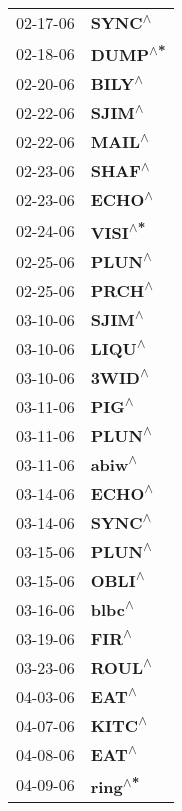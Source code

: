 \begin{supertabular}{p{0.08\textwidth}p{0.2\textwidth}}
 02-17-06 &    \textbf{SYNC\textsuperscript{$\wedge$}} \\
 02-18-06 &   \textbf{DUMP\textsuperscript{$\wedge$*}} \\
 02-20-06 &    \textbf{BILY\textsuperscript{$\wedge$}} \\
 02-22-06 &    \textbf{SJIM\textsuperscript{$\wedge$}} \\
 02-22-06 &    \textbf{MAIL\textsuperscript{$\wedge$}} \\
 02-23-06 &    \textbf{SHAF\textsuperscript{$\wedge$}} \\
 02-23-06 &    \textbf{ECHO\textsuperscript{$\wedge$}} \\
 02-24-06 &   \textbf{VISI\textsuperscript{$\wedge$*}} \\
 02-25-06 &    \textbf{PLUN\textsuperscript{$\wedge$}} \\
 02-25-06 &    \textbf{PRCH\textsuperscript{$\wedge$}} \\
 03-10-06 &    \textbf{SJIM\textsuperscript{$\wedge$}} \\
 03-10-06 &    \textbf{LIQU\textsuperscript{$\wedge$}} \\
 03-10-06 &    \textbf{3WID\textsuperscript{$\wedge$}} \\
 03-11-06 &     \textbf{PIG\textsuperscript{$\wedge$}} \\
 03-11-06 &    \textbf{PLUN\textsuperscript{$\wedge$}} \\
 03-11-06 &    \textbf{abiw\textsuperscript{$\wedge$}} \\
 03-14-06 &    \textbf{ECHO\textsuperscript{$\wedge$}} \\
 03-14-06 &    \textbf{SYNC\textsuperscript{$\wedge$}} \\
 03-15-06 &    \textbf{PLUN\textsuperscript{$\wedge$}} \\
 03-15-06 &    \textbf{OBLI\textsuperscript{$\wedge$}} \\
 03-16-06 &    \textbf{blbc\textsuperscript{$\wedge$}} \\
 03-19-06 &     \textbf{FIR\textsuperscript{$\wedge$}} \\
 03-23-06 &    \textbf{ROUL\textsuperscript{$\wedge$}} \\
 04-03-06 &     \textbf{EAT\textsuperscript{$\wedge$}} \\
 04-07-06 &    \textbf{KITC\textsuperscript{$\wedge$}} \\
 04-08-06 &     \textbf{EAT\textsuperscript{$\wedge$}} \\
 04-09-06 &   \textbf{ring\textsuperscript{$\wedge$*}} \\

\end{supertabular}
